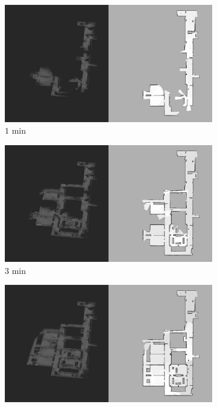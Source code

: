 \documentclass[smallextended]{svjour3}       %
\begin{document}
\begin{figure}[!t]
\centering
    	\begin{subfigure}[t]{0.38\columnwidth}
           	\centering
          	\includegraphics[trim={0cm 0cm 35cm 0cm}, clip, width=\textwidth]{Patrol_Split_Screen_1min.jpg}
        		\caption{$1$ min}
		\vspace*{0.05\textwidth}
    	\end{subfigure}
	\hspace*{0.05\textwidth}
    	\begin{subfigure}[t]{0.38\columnwidth}
           	\centering
          	\includegraphics[trim={0cm 0cm 35cm 0cm}, clip, width=\textwidth]{Patrol_Split_Screen_3min.jpg}
        		\caption{$3$ min}
		\vspace*{0.05\textwidth}
    	\end{subfigure}
	\begin{subfigure}[t]{0.38\columnwidth}
           	\centering
          	\includegraphics[trim={0cm 0cm 35cm 0cm}, clip, width=\textwidth]{Patrol_Split_Screen_5min.jpg}

\end{subfigure}
\end{figure}
\end{document}
